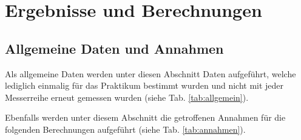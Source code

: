 \section{Ergebnisse und Berechnungen}
\label{sec:ergebnisse}

\subsection{Allgemeine Daten und Annahmen}
Als allgemeine Daten werden unter diesen Abschnitt Daten aufgeführt, welche lediglich einmalig für das Praktikum bestimmt wurden und nicht mit jeder Messerreihe erneut gemessen wurden (siehe Tab. \ref{tab:allgemein}).

\begin{table}[h!]
	\renewcommand*{\arraystretch}{1.2}
	\centering
	\caption{Allgemeine Daten}
	\label{tab:allgemein}
\end{table}%
\FloatBarrier

Ebenfalls werden unter diesem Abschnitt die getroffenen Annahmen für die folgenden Berechnungen aufgeführt (siehe Tab. \ref{tab:annahmen}).

\begin{table}[h!]
	\renewcommand*{\arraystretch}{1.2}
	\centering
	\caption{Annahmen}
	\label{tab:annahmen}
\end{table}%
\FloatBarrier

